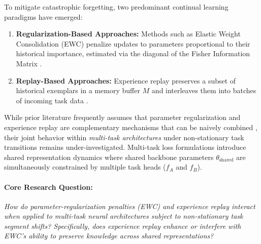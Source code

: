 \documentclass{article}
\begin{document}
To mitigate catastrophic forgetting, two predominant continual learning paradigms have emerged:
\begin{enumerate}
    \item \textbf{Regularization-Based Approaches:} Methods such as Elastic Weight Consolidation (EWC) penalize updates to parameters proportional to their historical importance, estimated via the diagonal of the Fisher Information Matrix \cite{kirkpatrick2017overcoming}.
    \item \textbf{Replay-Based Approaches:} Experience replay preserves a subset of historical exemplars in a memory buffer $M$ and interleaves them into batches of incoming task data \cite{chaudhry2019efficient, riemer2019learning}.
\end{enumerate}

While prior literature frequently assumes that parameter regularization and experience replay are complementary mechanisms that can be naively combined \cite{nguyen2018variational}, their joint behavior within \emph{multi-task architectures} under non-stationary task transitions remains under-investigated. Multi-task loss formulations introduce shared representation dynamics where shared backbone parameters $\theta_{\text{shared}}$ are simultaneously constrained by multiple task heads ($f_A$ and $f_B$).

\paragraph{Core Research Question:}
\emph{How do parameter-regularization penalties (EWC) and experience replay interact when applied to multi-task neural architectures subject to non-stationary task segment shifts? Specifically, does experience replay enhance or interfere with EWC's ability to preserve knowledge across shared representations?}
\end{document}
